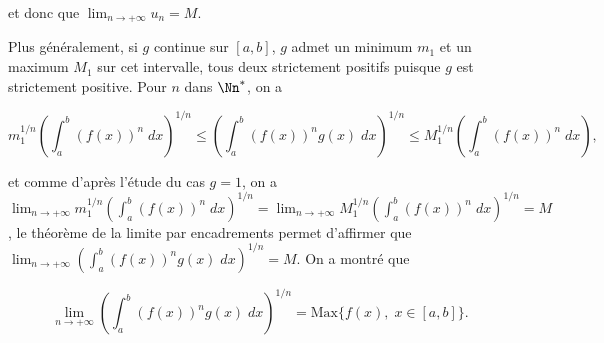 {{et donc que $\lim_{n\rightarrow +\infty}u_n=M$.

Plus généralement, si $g$ continue sur $[a,b]$, $g$ admet un minimum $m_1$ et un maximum $M_1$ sur cet intervalle, tous deux strictement positifs puisque $g$ est strictement positive. Pour $n$ dans $\Nn^*$, on a
 
$$m_1^{1/n}\left(\int_{a}^{b}(f(x))^n\;dx\right)^{1/n}\leq\left(\int_{a}^{b}(f(x))^ng(x)\;dx\right)^{1/n}\leq M_1^{1/n}\left(\int_{a}^{b}(f(x))^n\;dx\right),$$

et comme d'après l'étude du cas $g=1$, on a $\lim_{n\rightarrow +\infty}m_1^{1/n}\left(\int_{a}^{b}(f(x))^n\;dx\right)^{1/n}=\lim_{n\rightarrow +\infty}M_1^{1/n}\left(\int_{a}^{b}(f(x))^n\;dx\right)^{1/n}=M$, le théorème de la limite par encadrements permet d'affirmer que $\lim_{n\rightarrow +\infty}\left(\int_{a}^{b}(f(x))^ng(x)\;dx\right)^{1/n}=M$. On a montré que 

$$\lim_{n\rightarrow +\infty}\left(\int_{a}^{b}(f(x))^ng(x)\;dx\right)^{1/n}=\mbox{Max}\{f(x),\;x\in[a,b]\}.$$}
}